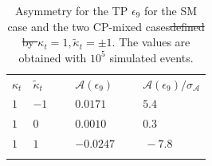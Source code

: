 \documentclass[aps,preprint,tightenlines,floatfix,superscriptaddress,nofootinbib,showpacs]{revtex4-1}
\def\kp{\kappa_t}
\def\kpt{\tilde{\kappa}_t}
\providecommand{\DIFdel}[1]{{\protect\color{red}\sout{#1}}}                      %
\providecommand{\DIFdelFL}[1]{\DIFdel{#1}} %
\providecommand{\DIFdelbeginFL}{} %
\providecommand{\DIFdelendFL}{} %
\begin{document}
%
\begin{table}[H]
\caption{Asymmetry for the TP $\epsilon_{9}$ for the SM case and the
  two $\mathrm{CP}$-mixed cases\DIFdelbeginFL \DIFdelFL{defined by $\kp=1,\kpt=\pm 1$}\DIFdelendFL . The
  values are obtained with $10^5$ simulated events.
  }
\label{table9}
\begin{center}
\begin{tabular}{|C{1cm}|C{1cm}||C{2cm}|C{2cm}|}
\hhline{|====|}
$\kappa_t$&$\tilde{\kappa}_t$~~&$\mathcal{A}(\epsilon_9)$~~&$\mathcal{A}(\epsilon_9)/\sigma_{\mathcal{A}}$ \\ 
\hhline{|====|} 
$1$ & $-1$~~~ & $0.0171$~ & $5.4$~ \\[0.6mm]
\hline
$1$ & $0$ & $0.0010$~ & $0.3$~ \\[0.6mm]
\hline
$1$ & $1$ & $-0.0247$~~~ & $\,-7.8$~~~~ \\[0.6mm]
\hhline{|====|}
\end{tabular}
\end{center} 
\end{table}
%
\end{document}
